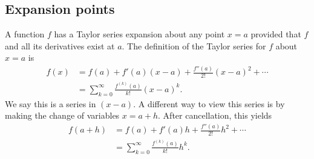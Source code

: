 \documentclass[a4paper]{book}
\begin{document}
\begin{sloppypar}
\subsection{Expansion points}
A function $f$ has a Taylor series expansion about any point $x=a$ provided that $f$ and all its derivatives exist at $a$. The definition of the Taylor series for $f$ about $x=a$ is
\begin{align*}
f(x) &= f(a) + f'(a)(x-a) + \frac{f''(a)}{2!}(x-a)^2 + \dotsb \\
&= \sum_{k=0}^\infty \frac{f^{\left(k\right)}(a)}{k!}(x-a)^k. 
\end{align*}
We say this is a series in $(x-a)$. A different way to view this series is by making the change of variables $x = a+h$. After cancellation, this yields
\begin{align*} 
f(a+h) &= f(a) + f'(a)h + \frac{f''(a)}{2!}h^2 + \dotsb \\
&= \sum_{k=0}^\infty \frac{f^{\left(k\right)}(a)}{k!}h^k. 
\end{align*}

\end{sloppypar}
\end{document}
